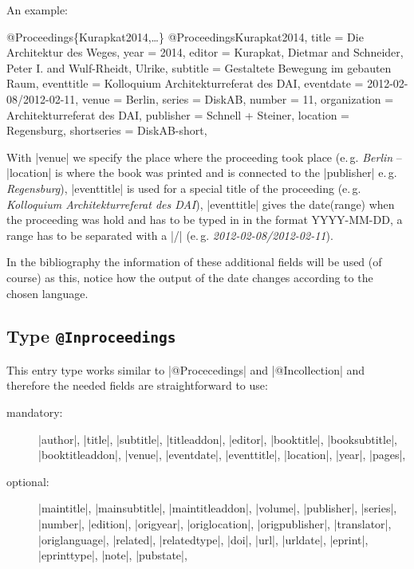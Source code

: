 \documentclass[a4paper,
10pt,
greek,
french,
spanish,
italian,
ngerman,
english
]{ltxdoc}
\begin{document}
An example:
 \begin{bibexample}[label=Kurapkat2014]{{@}Proceedings\{Kurapkat2014,…\}}
@Proceedings{Kurapkat2014,
  title        = {Die Architektur des Weges},
  year         = {2014},
  editor       = {Kurapkat, Dietmar and Schneider, Peter I. and Wulf-Rheidt, Ulrike},
  subtitle     = {Gestaltete Bewegung im gebauten Raum},
  eventtitle   = {Kolloquium Architekturreferat des DAI},
  eventdate    = {2012-02-08/2012-02-11},
  venue        = Berlin,     %
  series       = DiskAB,    %
  number       = {11},
  organization = {Architekturreferat des DAI},
  publisher    = {Schnell + Steiner},
  location     = Regensburg,     %
  shortseries  = DiskAB-short,    %
}
\end{bibexample}
With |venue| we specify the place where the proceeding took place 
(e.\,g. \emph{Berlin} -- |location| is where the book was printed and is connected 
to the |publisher| e.\,g. \emph{Regensburg}),
|eventtitle| is used for a special title of the proceeding (e.\,g. \emph{Kolloquium Architekturreferat des DAI}),
|eventtitle| gives the date(range) when the proceeding was hold and has to be typed in in the format YYYY-MM-DD, 
a range has to be separated with a |/| (e.\,g.  \emph{2012-02-08/2012-02-11}).

In the bibliography the information of these additional fields will be used (of course) as this, notice how the output of the date changes according to the chosen language.

\subsection{Type \texttt{@Inproceedings}}\label{inproceedings}
This entry type works similar to |@Procecedings| and |@Incollection| and therefore the needed fields are straightforward to use:

\begin{description}
\item[mandatory:] 
|author|, |title|, |subtitle|, |titleaddon|,
|editor|,  |booktitle|, |booksubtitle|, |booktitleaddon|,
|venue|, |eventdate|, |eventtitle|,
|location|, |year|, |pages|, 
\item[optional:]
|maintitle|, |mainsubtitle|, |maintitleaddon|, |volume|, 
|publisher|, |series|, |number|, |edition|, 
|origyear|, |origlocation|, |origpublisher|, 
|translator|, |origlanguage|,
|related|, |relatedtype|,
|doi|, |url|, |urldate|, |eprint|, |eprinttype|, |note|, |pubstate|, 
\end{description}
 
\end{document}
